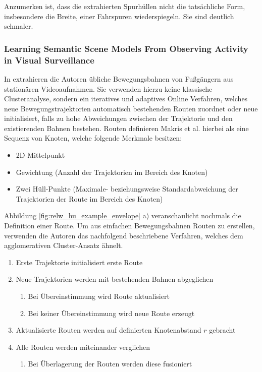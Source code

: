 Anzumerken ist, dass die extrahierten Spurhüllen nicht die tatsächliche Form, insbesondere die Breite, einer Fahrspuren
wiederspiegeln. Sie sind deutlich schmaler.


\subsubsection*{Learning Semantic Scene Models From Observing Activity in Visual Surveillance}
In \cite[]{Makris2005} extrahieren die Autoren übliche Bewegungsbahnen von Fußgängern aus stationären Videoaufnahmen.
Sie verwenden hierzu keine klassische Clusteranalyse, sondern ein iteratives und adaptives Online Verfahren,
welches neue Bewegungstrajektorien automatisch bestehenden Routen zuordnet oder neue initialisiert,
falls zu hohe Abweichungen zwischen der Trajektorie und den existierenden Bahnen bestehen.
Routen definieren Makris et al. hierbei als eine Sequenz von Knoten, welche folgende Merkmale besitzen:

\begin{itemize}
    \item 2D-Mittelpunkt
    \item Gewichtung (Anzahl der Trajektorien im Bereich des Knoten)
    \item Zwei Hüll-Punkte (Maximale- beziehungsweise Standardabweichung der Trajektorien der Route im Bereich des Knoten)
\end{itemize}

Abbildung \ref{fig:relw_hu_example_envelope} a) veranschaulicht nochmals die Definition einer Route.
Um aus einfachen Bewegungsbahnen Routen zu erstellen, verwenden die Autoren das nachfolgend beschriebene Verfahren,
welches dem agglomerativen Cluster-Ansatz ähnelt.

\begin{enumerate}
    \item Erste Trajektorie initialisiert erste Route
    \item Neue Trajektorien werden mit bestehenden Bahnen abgeglichen
    \begin{enumerate}
        \item Bei Übereinstimmung wird Route aktualisiert
        \item Bei keiner Übereinstimmung wird neue Route erzeugt
    \end{enumerate}
    \item Aktualisierte Routen werden auf definierten Knotenabstand $r$ gebracht
    \item Alle Routen werden miteinander verglichen
    \begin{enumerate}
        \item Bei Überlagerung der Routen werden diese fusioniert
    \end{enumerate}
\end{enumerate}

